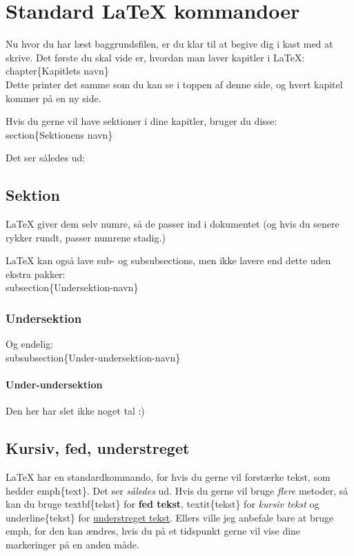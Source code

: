 \chapter{Standard LaTeX kommandoer}
Nu hvor du har læst baggrundsfilen, er du klar til at begive dig i kast med at skrive. Det første du skal vide er, hvordan man laver kapitler i LaTeX:\\ 

\bs chapter\{Kapitlets navn\}\\

\noindent %
Dette printer det samme som du kan se i toppen af denne side, og hvert kapitel kommer på en ny side.

\noindent
Hvis du gerne vil have sektioner i dine kapitler, bruger du disse:\\

\bs section\{Sektionens navn\}

\noindent
Det ser således ud:

\section{Sektion}
LaTeX giver dem selv numre, så de passer ind i dokumentet (og hvis du senere rykker rundt, passer numrene stadig.)

\noindent
LaTeX kan også lave sub- og subsubsections, men ikke lavere end dette uden ekstra pakker:\\

\bs subsection\{Undersektion-navn\}

\subsection{Undersektion}
Og endelig:\\

\bs subsubsection\{Under-undersektion-navn\}

\subsubsection{Under-undersektion}
Den her har slet ikke noget tal :)

\section{Kursiv, fed, understreget}
LaTeX har en standardkommando, for hvis du gerne vil forstærke tekst, som hedder \bs emph\{text\}. Det ser \emph{således} ud. Hvis du gerne vil bruge \emph{flere} metoder, så kan du bruge \bs textbf\{tekst\} for \textbf{fed tekst}, \bs textit\{tekst\} for \textit{kursiv tekst} og \bs underline\{tekst\} for \underline{understreget tekst}. Ellers ville jeg anbefale bare at bruge \bs emph, for den kan ændres, hvis du på et tidspunkt gerne vil vise dine markeringer på en anden måde.

